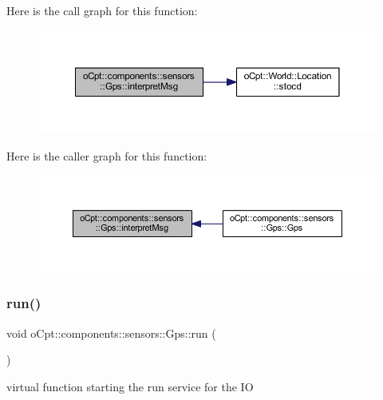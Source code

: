 Here is the call graph for this function\+:\nopagebreak
\begin{figure}[H]
\begin{center}
\leavevmode
\includegraphics[width=350pt]{classo_cpt_1_1components_1_1sensors_1_1_gps_a6effa9cffd5f203d84de1edce73be87a_cgraph}
\end{center}
\end{figure}
Here is the caller graph for this function\+:\nopagebreak
\begin{figure}[H]
\begin{center}
\leavevmode
\includegraphics[width=350pt]{classo_cpt_1_1components_1_1sensors_1_1_gps_a6effa9cffd5f203d84de1edce73be87a_icgraph}
\end{center}
\end{figure}
\hypertarget{classo_cpt_1_1components_1_1sensors_1_1_gps_af703c48b8b7220a1909570f46edae932}{}\label{classo_cpt_1_1components_1_1sensors_1_1_gps_af703c48b8b7220a1909570f46edae932} 
\subsubsection{\texorpdfstring{run()}{run()}}
{\footnotesize\ttfamily void o\+Cpt\+::components\+::sensors\+::\+Gps\+::run (\begin{DoxyParamCaption}{ }\end{DoxyParamCaption})\hspace{0.3cm}{\ttfamily [virtual]}}

virtual function starting the run service for the IO 


